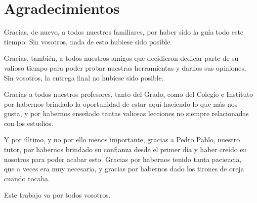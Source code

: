 
\chapter*{Agradecimientos}

Gracias, de nuevo, a todos nuestros familiares, por haber sido la guía  todo este tiempo. Sin vosotros, nada de esto hubiese sido posible.

\medskip

Gracias, también, a todos nuestros amigos que decidieron dedicar parte de su valioso tiempo para poder probar nuestras herramientas y darnos sus opiniones. Sin vosotros, la entrega final no hubiese sido posible. 

\medskip

Gracias a todos nuestros profesores, tanto del Grado, como del Colegio e Instituto por habernos brindado la oportunidad de estar aquí haciendo lo que más nos gusta, y por habernos enseñado tantas valiosas lecciones no siempre relacionadas con los estudios.

\medskip

Y por último, y no por ello menos importante, gracias a Pedro Pablo, nuestro tutor, por habernos brindado su confianza desde el primer día y haber creído en nosotros para poder acabar esto. Gracias por habernos tenido tanta paciencia, que a veces era muy necesaria, y gracias por habernos dado los tirones de oreja cuando tocaba.

\medskip

Este trabajo va por todos vosotros.











